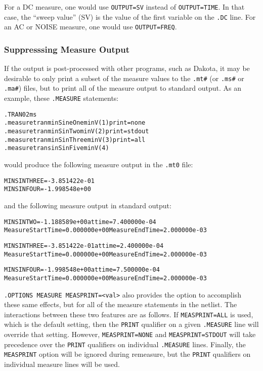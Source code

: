For a DC measure, one would use \texttt{OUTPUT=SV} instead
of \texttt{OUTPUT=TIME}.  In that case, the ``sweep value'' (SV) is
the value of the first variable on the
\texttt{.DC} line. For an AC or NOISE measure, one would use \texttt{OUTPUT=FREQ}.

\subsubsection{Suppresssing Measure Output}
\label{Measure_Suppressing_Measure_Output}
If the \Xyce{} output is post-processed with other programs, such as
Dakota, it may be desirable to only print a subset of the measure
values to the \texttt{.mt\#} (or \texttt{.ms\#} or \texttt{.ma\#})
files, but to print all of the measure output to standard output.  As
an example, these {\tt .MEASURE} statements:
\begin{alltt}
.TRAN 0  2ms
.measure tran minSineOne  min V(1) print=none
.measure tran minSinTwo   min V(2) print=stdout
.measure tran minSinThree min V(3) print=all
.measure tran sinSinFive  min V(4)
\end{alltt}
would produce the following measure output in the {\tt .mt0} file:
\begin{alltt}
MINSINTHREE = -3.851422e-01
MINSINFOUR = -1.998548e+00
\end{alltt}
and the following measure output in standard output:
\begin{alltt}
MINSINTWO = -1.188589e+00 at time = 7.400000e-04
Measure Start Time= 0.000000e+00	Measure End Time= 2.000000e-03

MINSINTHREE = -3.851422e-01 at time = 2.400000e-04
Measure Start Time= 0.000000e+00	Measure End Time= 2.000000e-03

MINSINFOUR = -1.998548e+00 at time = 7.500000e-04
Measure Start Time= 0.000000e+00	Measure End Time= 2.000000e-03
\end{alltt}

\texttt{.OPTIONS MEASURE MEASPRINT=<val>} also provides the option to accomplish
these same effects, but for all of the measure statements in the
netlist.  The interactions between these two features are as follows.
If \texttt{MEASPRINT=ALL} is used, which is the default setting, then
the \texttt{PRINT} qualifier on a given
\texttt{.MEASURE} line will override that setting.  However,
\texttt{MEASPRINT=NONE}
and \texttt{MEASPRINT=STDOUT} will take precedence over
the \texttt{PRINT} qualifiers on individual \texttt{.MEASURE} lines.
Finally, the \texttt{MEASPRINT} option will be ignored during
remeasure, but the \texttt{PRINT} qualifiers on individual measure
lines will be used.


